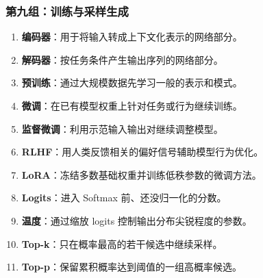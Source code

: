 \subsubsection{第九组：训练与采样生成}
\begin{enumerate}[leftmargin=2.5em,itemsep=4pt,start=81]
\item \textbf{编码器}：用于将输入转成上下文化表示的网络部分。 
\item \textbf{解码器}：按任务条件产生输出序列的网络部分。 
\item \textbf{预训练}：通过大规模数据先学习一般的表示和模式。 
\item \textbf{微调}：在已有模型权重上针对任务或行为继续训练。 
\item \textbf{监督微调}：利用示范输入输出对继续调整模型。 
\item \textbf{RLHF}：用人类反馈相关的偏好信号辅助模型行为优化。 
\item \textbf{LoRA}：冻结多数基础权重并训练低秩参数的微调方法。 
\item \textbf{Logits}：进入 Softmax 前、还没归一化的分数。 
\item \textbf{温度}：通过缩放 logits 控制输出分布尖锐程度的参数。 
\item \textbf{Top-k}：只在概率最高的若干候选中继续采样。 
\item \textbf{Top-p}：保留累积概率达到阈值的一组高概率候选。 
\end{enumerate}

